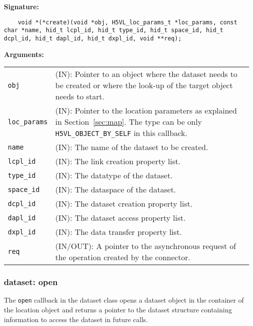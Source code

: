 \begin{mdframed}[style=bgbox]
\textbf{Signature:}
\begin{lstlisting}
    void *(*create)(void *obj, H5VL_loc_params_t *loc_params, const char *name, hid_t lcpl_id, hid_t type_id, hid_t space_id, hid_t dcpl_id, hid_t dapl_id, hid_t dxpl_id, void **req);
\end{lstlisting}

\textbf{Arguments:}\\
\begin{tabular}{l p{13.5cm}}
  \texttt{obj} & (IN): Pointer to an object where the dataset needs
  to be created or where the look-up of the target object needs to
  start.\\
  \texttt{loc\_params} & (IN): Pointer to the location parameters as explained in
  Section~\ref{sec:map}. The type can be only \texttt{H5VL\_OBJECT\_BY\_SELF} in this callback. \\
  \texttt{name} & (IN): The name of the dataset to be created.\\
  \texttt{lcpl\_id} & (IN): The link creation property list.\\
  \texttt{type\_id} & (IN): The datatype of the dataset.\\
  \texttt{space\_id} & (IN): The dataspace of the dataset.\\
  \texttt{dcpl\_id} & (IN): The dataset creation property list.\\
  \texttt{dapl\_id} & (IN): The dataset access property list.\\
  \texttt{dxpl\_id} & (IN): The data transfer property list.\\
  \texttt{req} & (IN/OUT): A pointer to the asynchronous request of the
  operation created by the connector.\\
\end{tabular}
\end{mdframed}

\subsubsection{dataset: open}
The \texttt{open} callback in the dataset class opens a dataset
object in the container of the location object and returns a pointer
to the dataset structure containing information to access the dataset
in future calls.\bigskip


